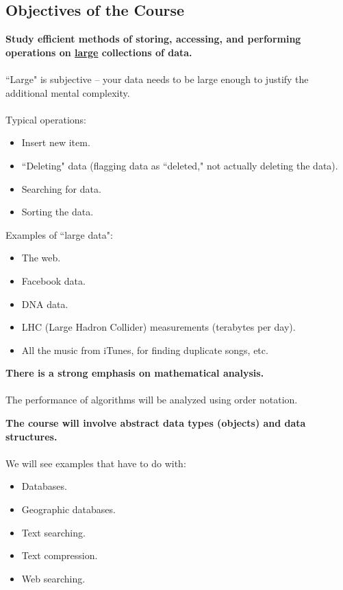 \documentclass[]{article}
\theoremstyle{definition}
\begin{document}
		\subsection{Objectives of the Course}
			\begin{itemize}
				\begin{item}
					\textbf{Study efficient methods of storing, accessing, and performing operations on \underline{large} collections of data.} \\ \\
					``Large" is subjective -- your data needs to be large enough to justify the additional mental complexity. \\ \\
					Typical operations:
					\begin{itemize}
						\item Insert new item.
						\item ``Deleting" data (flagging data as ``deleted," not actually deleting the data).
						\item Searching for data.
						\item Sorting the data. \\
					\end{itemize}

					Examples of ``large data":
					\begin{itemize}
						\item The web.
						\item Facebook data.
						\item DNA data.
						\item LHC (Large Hadron Collider) measurements (terabytes per day).
						\item All the music from iTunes, for finding duplicate songs, etc.
					\end{itemize}
				\end{item}

				\begin{item}
					\textbf{There is a strong emphasis on mathematical analysis.} \\ \\
					The performance of algorithms will be analyzed using order notation.
				\end{item}

				\begin{item}
					\textbf{The course will involve abstract data types (objects) and data structures.} \\ \\
					We will see examples that have to do with:
					\begin{itemize}
						\item Databases.
						\item Geographic databases.
						\item Text searching.
						\item Text compression.
						\item Web searching.
					\end{itemize}
				\end{item}
			\end{itemize}
\end{document}
